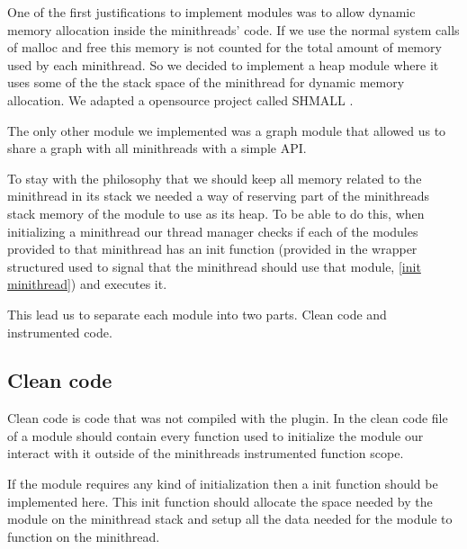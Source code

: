 \documentclass[12pt,a4paper]{report}
\begin{document}
One of the first justifications to implement modules was to allow dynamic memory allocation inside the minithreads' code. If we use the normal system calls of malloc and free this memory is not counted for the total amount of memory used by each minithread. So we decided to implement a heap module where it uses some of the the stack space of the minithread for dynamic memory allocation. We adapted a opensource project called SHMALL \cite{SHMALL}.

The only other module we implemented was a graph module that allowed us to share a graph with all minithreads with a simple API.


\iffalse

To stay with the philosophy that we should keep all memory related to the minithread in its stack we needed a way of reserving part of the minithreads stack memory of the module to use as its heap.
To be able to do this, when initializing a minithread our thread manager checks if each of the modules provided to that minithread has an init function (provided in the wrapper structured used to signal that the minithread should use that module, \ref{init minithread}) and executes it.

This lead us to separate each module into two parts. Clean code and instrumented code.

\subsection{Clean code}
Clean code is code that was not compiled with the plugin. 
In the clean code file of a module should contain every function used to initialize the module our interact with it outside of the minithreads instrumented function scope.

If the module requires any kind of initialization then a init function should be implemented here.
This init function should allocate the space needed by the module on the minithread stack and setup all the data needed for the module to function on the minithread.
\end{document}
